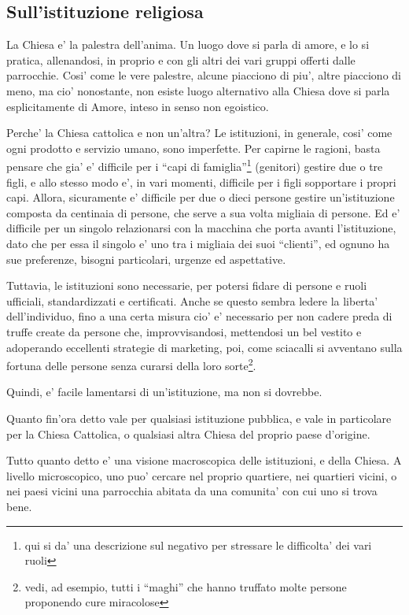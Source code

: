 \subsection{Sull'istituzione religiosa}
La Chiesa e' la palestra dell'anima. Un luogo dove si parla di amore, e lo si pratica, allenandosi, in proprio e con gli altri dei vari gruppi offerti dalle parrocchie. Cosi' come le vere palestre, alcune piacciono di piu', altre piacciono di meno, ma cio' nonostante, non esiste luogo alternativo alla Chiesa dove si parla esplicitamente di Amore, inteso in senso non egoistico. 

Perche' la Chiesa cattolica e non un'altra? Le istituzioni, in generale, cosi' come ogni prodotto e servizio umano, sono imperfette. Per capirne le ragioni, basta pensare che gia' e' difficile per i ``capi di famiglia''\footnote{qui si da' una descrizione sul negativo per stressare le difficolta' dei vari ruoli} (genitori) gestire due o tre figli, e allo stesso modo e', in vari momenti, difficile per i figli sopportare i propri capi. Allora, sicuramente e' difficile per due o dieci persone gestire un'istituzione composta da centinaia di persone, che serve a sua volta migliaia di persone. Ed e' difficile per un singolo relazionarsi con la macchina che porta avanti l'istituzione, dato che per essa il singolo e' uno tra i migliaia dei suoi ``clienti'', ed ognuno ha sue preferenze, bisogni particolari, urgenze ed aspettative.

Tuttavia, le istituzioni sono necessarie, per potersi fidare di persone e ruoli ufficiali, standardizzati e certificati. Anche se questo sembra ledere la liberta' dell'individuo, fino a una certa misura cio' e' necessario per non cadere preda di truffe create da persone che, improvvisandosi, mettendosi un bel vestito e adoperando eccellenti strategie di marketing, poi, come sciacalli si avventano sulla fortuna delle persone senza curarsi della loro sorte\footnote{vedi, ad esempio, tutti i ``maghi'' che hanno truffato molte persone proponendo cure miracolose}.

Quindi, e' facile lamentarsi di un'istituzione, ma non si dovrebbe.

Quanto fin'ora detto vale per qualsiasi istituzione pubblica, e vale in particolare per la Chiesa Cattolica, o qualsiasi altra Chiesa del proprio paese d'origine.

Tutto quanto detto e' una visione macroscopica delle istituzioni, e della Chiesa. A livello microscopico, uno puo' cercare nel proprio quartiere, nei quartieri vicini, o nei paesi vicini una parrocchia abitata da una comunita' con cui uno si trova bene.

